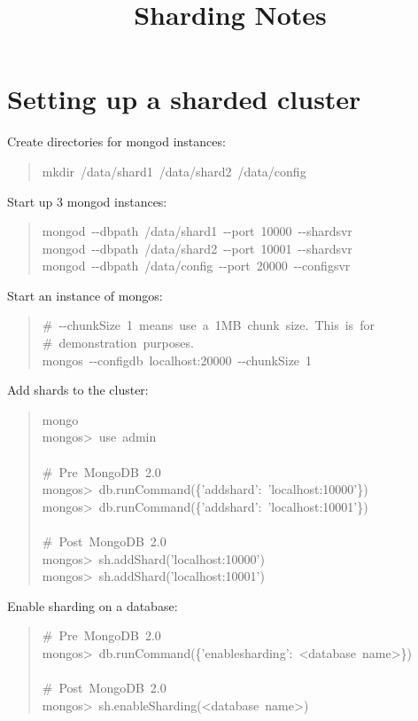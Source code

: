 \documentclass[letter]{article}
\title{\phantomsection%
  Sharding Notes%
  \label{sharding-notes}}
\author{}
\date{}
\begin{document}
\maketitle


\section{Setting up a sharded cluster%
  \label{setting-up-a-sharded-cluster}%
}

Create directories for mongod instances:
%
\begin{quote}{\ttfamily \raggedright \noindent
mkdir~/data/shard1~/data/shard2~/data/config
}
\end{quote}

Start up 3 mongod instances:
%
\begin{quote}{\ttfamily \raggedright \noindent
mongod~-{}-dbpath~/data/shard1~-{}-port~10000~-{}-shardsvr\\
mongod~-{}-dbpath~/data/shard2~-{}-port~10001~-{}-shardsvr\\
mongod~-{}-dbpath~/data/config~-{}-port~20000~-{}-configsvr
}
\end{quote}

Start an instance of mongos:
%
\begin{quote}{\ttfamily \raggedright \noindent
\#~-{}-chunkSize~1~means~use~a~1MB~chunk~size.~This~is~for\\
\#~demonstration~purposes.\\
mongos~-{}-configdb~localhost:20000~-{}-chunkSize~1
}
\end{quote}

Add shards to the cluster:
%
\begin{quote}{\ttfamily \raggedright \noindent
mongo\\
mongos>~use~admin\\
~\\
\#~Pre~MongoDB~2.0\\
mongos>~db.runCommand(\{'addshard':~'localhost:10000'\})\\
mongos>~db.runCommand(\{'addshard':~'localhost:10001'\})\\
~\\
\#~Post~MongoDB~2.0\\
mongos>~sh.addShard('localhost:10000')\\
mongos>~sh.addShard('localhost:10001')
}
\end{quote}

Enable sharding on a database:
%
\begin{quote}{\ttfamily \raggedright \noindent
\#~Pre~MongoDB~2.0\\
mongos>~db.runCommand(\{'enablesharding':~<database~name>\})\\
~\\
\#~Post~MongoDB~2.0\\
mongos>~sh.enableSharding(<database~name>)
}
\end{quote}
\end{document}
